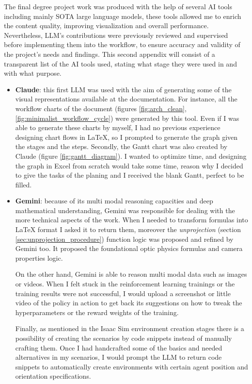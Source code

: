 The final degree project work was produced with the help of several AI tools including mainly SOTA large language models, these tools allowed me to enrich the content quality, improving visualization and overall performance. Nevertheless, LLM's contributions were previously reviewed and supervised before implementing them into the workflow, to ensure accuracy and validity of the project's needs and findings. This second appendix will consist of a transparent list of the AI tools used, stating what stage they were used in and with what purpose.

\begin{itemize}
	\item \textbf{Claude}: this first LLM was used with the aim of generating some of the visual representations available at the documentation. For instance, all the workflow charts of the document (figures \ref{fig:arch_clean}, \ref{fig:minimalist_workflow_cycle}) were generated by this tool. Even if I was able to generate these charts by myself, I had no previous experience designing chart flows in LaTeX, so I prompted to generate the graph given the stages and the steps. Secondly, the Gantt chart was also created by Claude (figure \ref{fig:gantt_diagram}). I wanted to optimize time, and designing the graph in Excel from scratch would take some time, reason why I decided to give the tasks of the planing and I received the blank Gantt, perfect to be filled. 
	
	\item \textbf{Gemini}: because of its multi modal reasoning capacities and deep mathematical understanding, Gemini was responsible for dealing with the more technical aspects of the work. When I needed to transform formulas into LaTeX format I asked it to return them, moreover the \textit{unprojection} (section \ref{sec:unprojection_procedure}) function logic was proposed and refined by Gemini too. It proposed the foundational optic physics formulas  and camera properties logic. 
	
	On the other hand, Gemini is able to reason multi modal data such as images or videos. When I felt stuck in the reinforcement learning trainings or the training results were not successful, I would upload a screenshot or little video of the policy in action to get back its suggestions on how to tweak the hyperparameters or the reward weights of the training. 
	
	Finally, as mentioned in the Isaac Sim environment creation stages there is a possibility of creating the scenarios by code snippets instead of manually crafting them. Once I had handcrafted some of the basics and needed alternatives in my scenarios, I would prompt the LLM to return code snippets to automatically create environments with certain agent position and orientation specifications.  
\end{itemize}